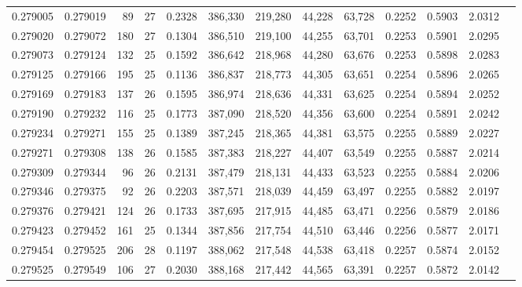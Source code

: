 \begin{tabular}{rrrrrrrrrrrrr}
0.279005 & 0.279019 &    89 &  27 &                                     0.2328 & 386,330 & 219,280 &  44,228 &  63,728 & 0.2252 & 0.5903 & 2.0312 \\
0.279020 & 0.279072 &   180 &  27 &                                     0.1304 & 386,510 & 219,100 &  44,255 &  63,701 & 0.2253 & 0.5901 & 2.0295 \\
0.279073 & 0.279124 &   132 &  25 &                                     0.1592 & 386,642 & 218,968 &  44,280 &  63,676 & 0.2253 & 0.5898 & 2.0283 \\
0.279125 & 0.279166 &   195 &  25 &                                     0.1136 & 386,837 & 218,773 &  44,305 &  63,651 & 0.2254 & 0.5896 & 2.0265 \\
0.279169 & 0.279183 &   137 &  26 &                                     0.1595 & 386,974 & 218,636 &  44,331 &  63,625 & 0.2254 & 0.5894 & 2.0252 \\
0.279190 & 0.279232 &   116 &  25 &                                     0.1773 & 387,090 & 218,520 &  44,356 &  63,600 & 0.2254 & 0.5891 & 2.0242 \\
0.279234 & 0.279271 &   155 &  25 &                                     0.1389 & 387,245 & 218,365 &  44,381 &  63,575 & 0.2255 & 0.5889 & 2.0227 \\
0.279271 & 0.279308 &   138 &  26 &                                     0.1585 & 387,383 & 218,227 &  44,407 &  63,549 & 0.2255 & 0.5887 & 2.0214 \\
0.279309 & 0.279344 &    96 &  26 &                                     0.2131 & 387,479 & 218,131 &  44,433 &  63,523 & 0.2255 & 0.5884 & 2.0206 \\
0.279346 & 0.279375 &    92 &  26 &                                     0.2203 & 387,571 & 218,039 &  44,459 &  63,497 & 0.2255 & 0.5882 & 2.0197 \\
0.279376 & 0.279421 &   124 &  26 &                                     0.1733 & 387,695 & 217,915 &  44,485 &  63,471 & 0.2256 & 0.5879 & 2.0186 \\
0.279423 & 0.279452 &   161 &  25 &                                     0.1344 & 387,856 & 217,754 &  44,510 &  63,446 & 0.2256 & 0.5877 & 2.0171 \\
0.279454 & 0.279525 &   206 &  28 &                                     0.1197 & 388,062 & 217,548 &  44,538 &  63,418 & 0.2257 & 0.5874 & 2.0152 \\
0.279525 & 0.279549 &   106 &  27 &                                     0.2030 & 388,168 & 217,442 &  44,565 &  63,391 & 0.2257 & 0.5872 & 2.0142 \\

\end{tabular}
